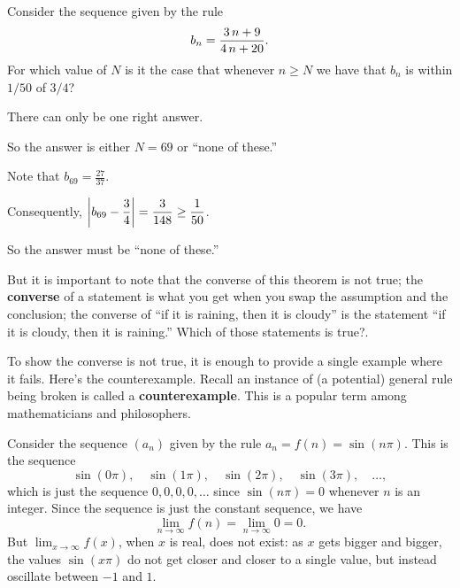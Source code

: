 \documentclass{ximera}
\newcommand{\defnword}[1]{\textbf{#1}}
\newcommand{\ds}{\displaystyle}
\begin{document}
\begin{question}
  Consider the sequence given by the rule \[b_{n} = \displaystyle\displaystyle\frac{ 3 \, n + 9 }{ 4 \, n + 20 }.\]  For which value of \(N\) is it the case that whenever \(n \geq N\) we have that \(b_{n}\) is within \(1/50\) of \(3/4\)?

  \begin{solution}
    \begin{hint}
      There can only be one right answer.
    \end{hint}
    \begin{hint}
      So the answer is either \(N = 69\) or ``none of these.''
    \end{hint}
    \begin{hint}
      Note that \(b_{69} = \displaystyle\frac{27}{37}\).
    \end{hint}
    \begin{hint}
      Consequently, \(\left| b_{69} - \displaystyle \displaystyle\frac{3}{4} \right| = \displaystyle\frac{3}{148} \geq \displaystyle\frac{1}{50}\).
    \end{hint}
    \begin{hint}
      So the answer must be ``none of these.''
    \end{hint}

    \begin{multiple-choice}
    \end{multiple-choice}

  \end{solution}
\end{question}

But it is important to note that the converse of this theorem is not
true; \label{sidenote:raining-converse}the \defnword{converse} of a
statement is what you get when you swap the assumption and the
conclusion; the converse of ``if it is raining, then it is cloudy'' is
the statement ``if it is cloudy, then it is raining.''  Which of those
statements is true?.

To show the converse is not true, it is enough to provide a single
example where it fails.  Here's the counterexample.  Recall an
instance of (a potential) general rule being broken is called a
\defnword{counterexample}.  This is a popular term among
mathematicians and philosophers.

\begin{example}
  Consider the sequence $(a_n)$ given by the rule $a_n = f(n)=\sin(n\pi)$.  This is the sequence
$$
  \sin(0\pi),\quad \sin(1\pi),\quad\sin(2\pi),\quad\sin(3\pi),\quad\ldots,
$$
which is just the sequence $0, 0, 0, 0, \ldots$ since $\sin(n\pi)=0$
whenever $n$ is an integer.  Since the sequence is just the constant sequence, we have
$$
\lim_{n\to\infty} f(n)= \lim_{n\to\infty} 0 = 0. 
$$But $\ds \lim_{x\to\infty}f(x)$, when $x$ is real, does not exist: as $x$ gets
bigger and bigger, the values $\sin(x\pi)$ do not get closer and
closer to a single value, but instead oscillate between $-1$ and $1$.
\end{example} 
\end{document}
